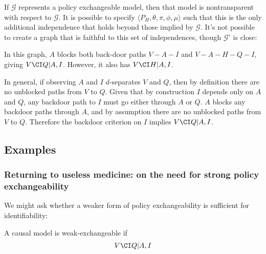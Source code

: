 If $\mathcal{G}$ represents a policy exchangeable model, then that model is nontransparent with respect to $\mathcal{G}$. It is possible to specify $\langle P_H, \theta,\pi,\phi,\mu\rangle$ such that this is the only additional independence that holds beyond those implied by $\mathcal{G}$. It's not possible to create a graph that is faithful to this set of independences, though $\mathcal{G}'$ is close:

\begin{center}
\end{center}

In this graph, $A$ blocks both back-door paths $V-A-I$ and $V-A-H-Q-I$, giving $V\CI Q|A,I$. However, it also has $V\CI H|A,I$.

In general, if observing $A$ and $I$ $d$-separates $V$ and $Q$, then by definition there are no unblocked paths from $V$ to $Q$. Given that by construction $I$ depends only on $A$ and $Q$, any backdoor path to $I$ must go either through $A$ or $Q$. $A$ blocks any backdoor paths through $A$, and by assumption there are no unblocked paths from $V$ to $Q$. Therefore the backdoor criterion on $I$ implies $V\CI Q|A,I$.


\subsection{Examples}

\subsubsection{Returning to useless medicine: on the need for strong policy exchangeability}

We might ask whether a weaker form of policy exchangeability is sufficient for identifiability:

\begin{definition}
A causal model is weak-exchangeable if
\begin{align}
    V\CI Q | A,I
\end{align}
\end{definition}

